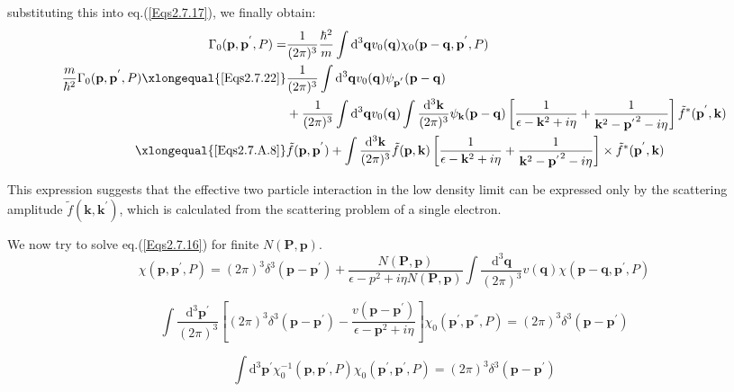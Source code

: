 substituting this into eq.(\ref{Eqs2.7.17}), we finally obtain:
\begin{equation} \label{Eqs2.7.23} \begin{split}
\Gamma_0(\mathbf{p},\mathbf{p}^{'},P) =& \frac{1}{(2\pi)^3} \frac{\hbar^2}{m} \int \mathrm{d}^3\mathbf{q} v_0(\mathbf{q}) \chi_0(\mathbf{p}-\mathbf{q},\mathbf{p}^{'},P)\\
\frac{m}{\hbar^2}\Gamma_0(\mathbf{p},\mathbf{p}^{'},P) \xlongequal{\ref{Eqs2.7.22}}&\frac{1}{(2\pi)^3} \int \mathrm{d}^3 \mathbf{q} v_0(\mathbf{q}) \psi_{\mathbf{p}^{'}}(\mathbf{p}-\mathbf{q})\\
&+ \frac{1}{(2\pi)^3} \int \mathrm{d}^3 \mathbf{q} v_0(\mathbf{q}) \int \frac{\mathrm{d}^3\mathbf{k}}{(2\pi)^3} \psi_{\mathbf{k}}(\mathbf{p}-\mathbf{q})\left[ \frac{1}{\epsilon-\mathbf{k}^2+i \eta} + \frac{1}{\mathbf{k}^2-{\mathbf{p}^{'}}^2-i \eta} \right] \tilde{f}^{*}(\mathbf{p}^{'},\mathbf{k})\\
\xlongequal{\ref{Eqs2.7.A.8}}& \tilde{f}(\mathbf{p},\mathbf{p}^{'}) + \int \frac{\mathrm{d}^3 \mathbf{k}}{(2\pi)^3} \tilde{f}(\mathbf{p},\mathbf{k})\left[ \frac{1}{\epsilon-\mathbf{k}^2+i \eta} + \frac{1}{\mathbf{k}^2-{\mathbf{p}^{'}}^2-i \eta} \right] \times \tilde{f}^{*}(\mathbf{p}^{'},\mathbf{k})
\end{split}\end{equation}

This expression suggests that the effective two particle interaction in the low density limit can be expressed only by the scattering amplitude $\tilde{f}(\mathbf{k},\mathbf{k}^{'})$, which is calculated from the scattering problem of a single electron.

We now try to solve eq.(\ref{Eqs2.7.16}) for finite $N(\mathbf{P},\mathbf{p})$.
\begin{equation*} \label{Eqs2.7.16'} \tag{2.7.16'}
\chi(\mathbf{p},\mathbf{p}^{'},P)=(2\pi)^3 \delta^3(\mathbf{p}-\mathbf{p}^{'}) + \frac{N(\mathbf{P},\mathbf{p})}{\epsilon - p^2 + i \eta N(\mathbf{P},\mathbf{p})} \int \frac{\mathrm{d}^3\mathbf{q}}{(2\pi)^3}v(\mathbf{q})\chi(\mathbf{p}-\mathbf{q},\mathbf{p}^{'},P)
\end{equation*}

\[\int \frac{\mathrm{d}^3\mathbf{p}^{'}}{(2\pi)^3}\left[ (2\pi)^3 \delta^3(\mathbf{p}-\mathbf{p}^{'})-\frac{v(\mathbf{p}-\mathbf{p}^{'})}{\epsilon-\mathbf{p}^2+i \eta} \right] \chi_0(\mathbf{p}^{'},\mathbf{p}^{''},P) = (2\pi)^3 \delta^3(\mathbf{p}-\mathbf{p}^{'}) \]

\[ \int \mathrm{d}^3 \mathbf{p}^{'} \chi_0^{-1}(\mathbf{p},\mathbf{p}^{'},P)\chi_0(\mathbf{p}^{'},\mathbf{p}^{'},P) = (2\pi)^3 \delta^3(\mathbf{p}-\mathbf{p}^{'})\]


